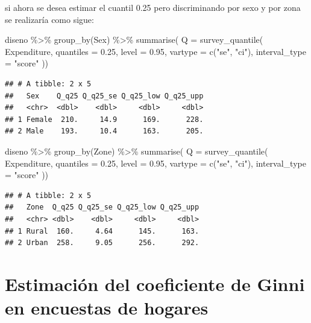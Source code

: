 \documentclass[
  12pt,
]{book}
\newenvironment{Shaded}{\begin{snugshade}}{\end{snugshade}}
\newcommand{\AttributeTok}[1]{\textcolor[rgb]{0.77,0.63,0.00}{#1}}
\newcommand{\FloatTok}[1]{\textcolor[rgb]{0.00,0.00,0.81}{#1}}
\newcommand{\FunctionTok}[1]{\textcolor[rgb]{0.00,0.00,0.00}{#1}}
\newcommand{\NormalTok}[1]{#1}
\newcommand{\SpecialCharTok}[1]{\textcolor[rgb]{0.00,0.00,0.00}{#1}}
\newcommand{\StringTok}[1]{\textcolor[rgb]{0.31,0.60,0.02}{#1}}
\begin{document}
si ahora se desea estimar el cuantil 0.25 pero discriminando por sexo y por zona se realizaría como sigue:

\begin{Shaded}
\begin{Highlighting}[]
\NormalTok{diseno }\SpecialCharTok{\%\textgreater{}\%} \FunctionTok{group\_by}\NormalTok{(Sex) }\SpecialCharTok{\%\textgreater{}\%} 
  \FunctionTok{summarise}\NormalTok{(}
    \AttributeTok{Q =}  \FunctionTok{survey\_quantile}\NormalTok{(}
\NormalTok{    Expenditure,}
    \AttributeTok{quantiles =} \FloatTok{0.25}\NormalTok{,}
    \AttributeTok{level =} \FloatTok{0.95}\NormalTok{,}
    \AttributeTok{vartype =}  \FunctionTok{c}\NormalTok{(}\StringTok{"se"}\NormalTok{, }\StringTok{"ci"}\NormalTok{),}
    \AttributeTok{interval\_type =} \StringTok{"score"}
\NormalTok{   ))}
\end{Highlighting}
\end{Shaded}

\begin{verbatim}
## # A tibble: 2 x 5
##   Sex    Q_q25 Q_q25_se Q_q25_low Q_q25_upp
##   <chr>  <dbl>    <dbl>     <dbl>     <dbl>
## 1 Female  210.     14.9      169.      228.
## 2 Male    193.     10.4      163.      205.
\end{verbatim}

\begin{Shaded}
\begin{Highlighting}[]
\NormalTok{diseno }\SpecialCharTok{\%\textgreater{}\%} \FunctionTok{group\_by}\NormalTok{(Zone) }\SpecialCharTok{\%\textgreater{}\%} 
  \FunctionTok{summarise}\NormalTok{(}
    \AttributeTok{Q =}  \FunctionTok{survey\_quantile}\NormalTok{(}
\NormalTok{    Expenditure,}
    \AttributeTok{quantiles =} \FloatTok{0.25}\NormalTok{,}
    \AttributeTok{level =} \FloatTok{0.95}\NormalTok{,}
    \AttributeTok{vartype =}  \FunctionTok{c}\NormalTok{(}\StringTok{"se"}\NormalTok{, }\StringTok{"ci"}\NormalTok{),}
    \AttributeTok{interval\_type =} \StringTok{"score"}
\NormalTok{   ))}
\end{Highlighting}
\end{Shaded}

\begin{verbatim}
## # A tibble: 2 x 5
##   Zone  Q_q25 Q_q25_se Q_q25_low Q_q25_upp
##   <chr> <dbl>    <dbl>     <dbl>     <dbl>
## 1 Rural  160.     4.64      145.      163.
## 2 Urban  258.     9.05      256.      292.
\end{verbatim}

\hypertarget{estimaciuxf3n-del-coeficiente-de-ginni-en-encuestas-de-hogares}{%
\section{Estimación del coeficiente de Ginni en encuestas de hogares}\label{estimaciuxf3n-del-coeficiente-de-ginni-en-encuestas-de-hogares}}
\end{document}
